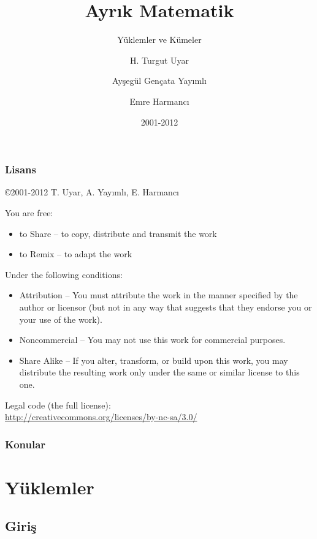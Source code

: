 \documentclass[dvipsnames]{beamer}
\title{Ayrık Matematik}
\subtitle{Yüklemler ve Kümeler}
\author{H. Turgut Uyar \and Ayşegül Gençata Yayımlı \and Emre Harmancı}
\date{2001-2012}
\theoremstyle{definition}
\theoremstyle{example}
\theoremstyle{plain}
\begin{document}
\begin{frame}
  \titlepage
\end{frame}

\begin{frame}
  \frametitle{Lisans}

  \hfill
  \copyright 2001-2012 T. Uyar, A. Yayımlı, E. Harmancı

  \vfill
  \begin{tiny}
    You are free:
    \begin{itemize}
      \item to Share -- to copy, distribute and transmit the work
      \item to Remix -- to adapt the work
    \end{itemize}

    Under the following conditions:
    \begin{itemize}
      \item Attribution -- You must attribute the work in the manner specified by
        the author or licensor (but not in any way that suggests that they
        endorse you or your use of the work).

      \item Noncommercial -- You may not use this work for commercial purposes.

      \item Share Alike -- If you alter, transform, or build upon this work, you
        may distribute the resulting work only under the same or similar license
        to this one.
    \end{itemize}
  \end{tiny}

  \vfill
  Legal code (the full license):\\
  \url{http://creativecommons.org/licenses/by-nc-sa/3.0/}
\end{frame}

\begin{frame}
  \frametitle{Konular}
  \tableofcontents
\end{frame}

\section{Yüklemler}

\subsection{Giriş}
\end{document}
